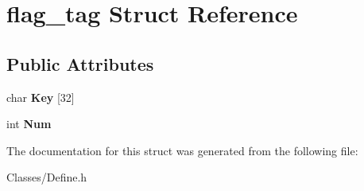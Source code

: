 \hypertarget{structflag__tag}{}\section{flag\+\_\+tag Struct Reference}
\label{structflag__tag}
\subsection*{Public Attributes}
\begin{DoxyCompactItemize}
\item 
char {\bfseries Key} \mbox{[}32\mbox{]}\hypertarget{structflag__tag_a1c25ae1024d23cc53467708833633e42}{}\label{structflag__tag_a1c25ae1024d23cc53467708833633e42}

\item 
int {\bfseries Num}\hypertarget{structflag__tag_a519bdb1ce1be06e65a18f9bc70da7f49}{}\label{structflag__tag_a519bdb1ce1be06e65a18f9bc70da7f49}

\end{DoxyCompactItemize}


The documentation for this struct was generated from the following file\+:\begin{DoxyCompactItemize}
\item 
Classes/Define.\+h\end{DoxyCompactItemize}
